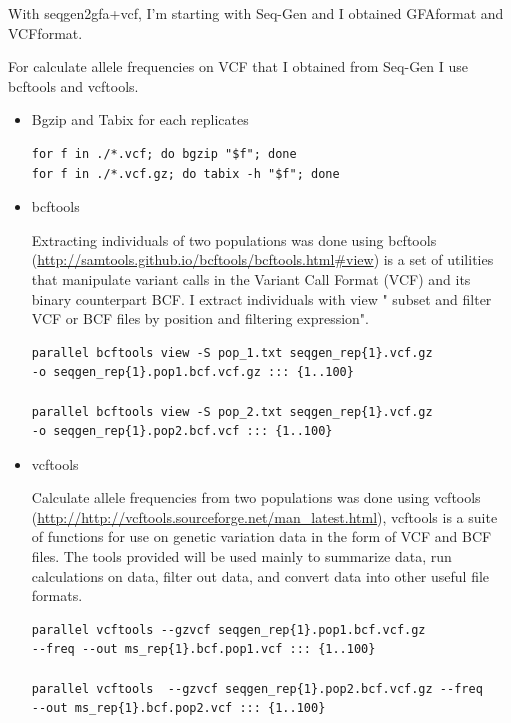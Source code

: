 With seqgen2gfa+vcf, I'm starting with Seq-Gen and I obtained GFAformat and VCFformat. 

For calculate allele frequencies on VCF that I obtained from Seq-Gen I use bcftools and vcftools.

\begin{itemize}
    \item Bgzip and Tabix for each replicates

\begin{verbatim}
for f in ./*.vcf; do bgzip "$f"; done   
for f in ./*.vcf.gz; do tabix -h "$f"; done
\end{verbatim}



\item bcftools

Extracting individuals of two populations was done using bcftools (\url{http://samtools.github.io/bcftools/bcftools.html#view})  is a set of utilities that manipulate variant calls in the Variant Call Format (VCF) and its binary counterpart BCF.  I extract individuals with view " subset and filter VCF or BCF files by position and filtering expression".


\begin{verbatim}
parallel bcftools view -S pop_1.txt seqgen_rep{1}.vcf.gz
-o seqgen_rep{1}.pop1.bcf.vcf.gz ::: {1..100} 

parallel bcftools view -S pop_2.txt seqgen_rep{1}.vcf.gz 
-o seqgen_rep{1}.pop2.bcf.vcf ::: {1..100}  
\end{verbatim}

\item vcftools

Calculate allele frequencies from two populations was done using vcftools (\url{http://http://vcftools.sourceforge.net/man_latest.html}), vcftools is a suite of functions for use on genetic variation data in the form of VCF and BCF files. The tools provided will be used mainly to summarize data, run calculations on data, filter out data, and convert data into other useful file formats.

\begin{verbatim}
parallel vcftools --gzvcf seqgen_rep{1}.pop1.bcf.vcf.gz 
--freq --out ms_rep{1}.bcf.pop1.vcf ::: {1..100} 

parallel vcftools  --gzvcf seqgen_rep{1}.pop2.bcf.vcf.gz --freq 
--out ms_rep{1}.bcf.pop2.vcf ::: {1..100}  
\end{verbatim}



\end{itemize}


